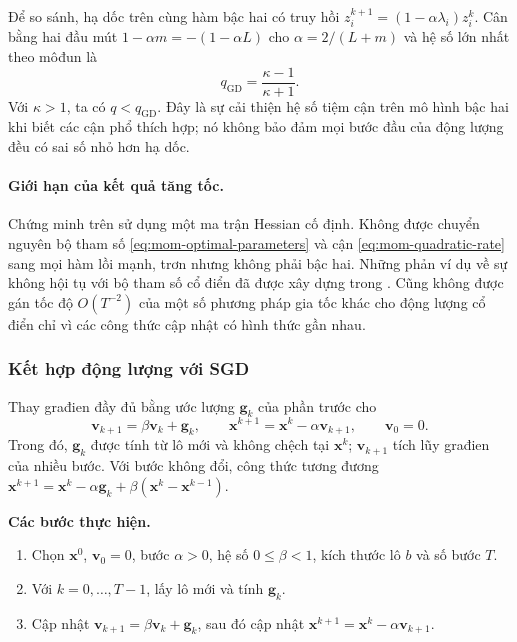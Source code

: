 Để so sánh, hạ dốc trên cùng hàm bậc hai có truy hồi
$z_i^{k+1}=(1-\alpha\lambda_i)z_i^{k}$.
Cân bằng hai đầu mút $1-\alpha m=-(1-\alpha L)$ cho
$\alpha=2/(L+m)$ và hệ số lớn nhất theo môđun là
\begin{equation}
 q_{\mathrm{GD}}=\frac{\kappa-1}{\kappa+1}.
 \label{eq:mom-gd-factor}
\end{equation}
Với $\kappa>1$, ta có $q<q_{\mathrm{GD}}$.
Đây là sự cải thiện hệ số tiệm cận trên mô hình bậc hai khi biết các
cận phổ thích hợp; nó không bảo đảm mọi bước đầu của động lượng đều
có sai số nhỏ hơn hạ dốc.

\paragraph{Giới hạn của kết quả tăng tốc.}
Chứng minh trên sử dụng một ma trận Hessian cố định. Không được chuyển
nguyên bộ tham số \eqref{eq:mom-optimal-parameters} và cận
\eqref{eq:mom-quadratic-rate} sang mọi hàm lồi mạnh, trơn nhưng không
phải bậc hai. Những phản ví dụ về sự không hội tụ với bộ tham số cổ
điển đã được xây dựng trong \cite[Phụ lục~B]{lessard2016analysis}.
Cũng không được gán tốc độ $O(T^{-2})$ của một số phương pháp gia tốc
khác cho động lượng cổ điển chỉ vì các công thức cập nhật có hình thức
gần nhau.

\subsubsection{Kết hợp động lượng với SGD}

Thay građien đầy đủ bằng ước lượng $\mathbf{g}_k$ của phần trước cho
\begin{equation}
 \mathbf{v}_{k+1}=\beta\mathbf{v}_k+\mathbf{g}_k,
 \qquad \mathbf{x}^{k+1}=\mathbf{x}^{k}-\alpha\mathbf{v}_{k+1},
 \qquad \mathbf{v}_0=0.
 \label{eq:mom-sgd}
\end{equation}
Trong đó, $\mathbf{g}_k$ được tính từ lô mới và không chệch tại
$\mathbf{x}^{k}$; $\mathbf{v}_{k+1}$ tích lũy građien của nhiều bước.
Với bước không đổi, công thức tương đương
$\mathbf{x}^{k+1}=\mathbf{x}^{k}-\alpha\mathbf{g}_k+
\beta(\mathbf{x}^{k}-\mathbf{x}^{k-1})$.

\begin{samepage}
\noindent\textbf{Các bước thực hiện.}\par\nopagebreak[4]
\begin{enumerate}[label=\arabic*.,leftmargin=*]
 \item Chọn $\mathbf{x}^{0}$, $\mathbf{v}_0=0$, bước $\alpha>0$,
 hệ số $0\leq\beta<1$, kích thước lô $b$ và số bước $T$.
 \item Với $k=0,\ldots,T-1$, lấy lô mới và tính $\mathbf{g}_k$.
 \item Cập nhật $\mathbf{v}_{k+1}=\beta\mathbf{v}_k+\mathbf{g}_k$,
 sau đó cập nhật $\mathbf{x}^{k+1}=\mathbf{x}^{k}-\alpha\mathbf{v}_{k+1}$.
\end{enumerate}
\end{samepage}

